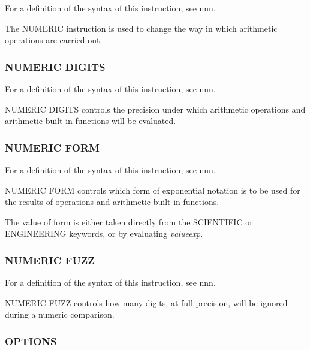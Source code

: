 For a definition of the syntax of this instruction, see nnn.

The NUMERIC instruction is used to change the way in which arithmetic
operations are carried out.

\subsubsection{NUMERIC DIGITS}\label{numeric-digits}

For a definition of the syntax of this instruction, see nnn.

NUMERIC DIGITS controls the precision under which arithmetic operations
and arithmetic built-in functions will be evaluated.



\subsubsection{NUMERIC FORM}\label{numeric-form}

For a definition of the syntax of this instruction, see nnn.

NUMERIC FORM controls which form of exponential notation is to be used
for the results of operations and arithmetic built-in functions.

The value of form is either taken directly from the SCIENTIFIC or
ENGINEERING keywords, or by evaluating \emph{valueexp}.



\subsubsection{NUMERIC FUZZ}\label{numeric-fuzz}

For a definition of the syntax of this instruction, see nnn.

NUMERIC FUZZ controls how many digits, at full precision, will be
ignored during a numeric comparison.



\subsubsection{OPTIONS}\label{options}

